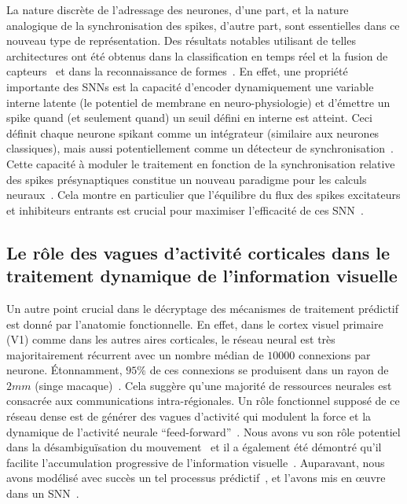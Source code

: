 La nature discrète de l'adressage des neurones, d'une part, et la nature
analogique de la synchronisation des spikes, d'autre part, sont
essentielles dans ce nouveau type de représentation. Des résultats
notables utilisant de telles architectures ont été obtenus dans la
classification en temps réel et la fusion de capteurs~\citep{Oconnor13} et dans la reconnaissance de formes~\citep{Lagorce17}. En
effet, une propriété importante des SNNs est la capacité d'encoder
dynamiquement une variable interne latente (le potentiel de membrane en
neuro-physiologie) et d'émettre un spike quand (et seulement quand) un
seuil défini en interne est atteint. Ceci définit chaque neurone spikant
comme un intégrateur (similaire aux neurones classiques), mais aussi
potentiellement comme un détecteur de synchronisation~\citep{Perrinet02}.
Cette capacité à moduler le traitement en fonction de la synchronisation
relative des spikes présynaptiques constitue un nouveau paradigme pour les
calculs neuraux~\citep{Paugam12}. Cela montre en
particulier que l'équilibre du flux des spikes excitateurs et inhibiteurs
entrants est crucial pour maximiser l'efficacité de ces SNN~\citep{Hansel12}.

\subsection{Le rôle des vagues d'activité corticales dans le traitement
dynamique de l'information
visuelle}
Un autre point crucial dans le décryptage des mécanismes de traitement
prédictif est donné par l'anatomie fonctionnelle. En effet, dans le
cortex visuel primaire (V1) comme dans les autres aires corticales, le
réseau neural est très majoritairement récurrent avec un nombre médian de $10000$
connexions par neurone. Étonnamment, $95 \%$ de ces connexions se
produisent dans un rayon de $2 mm$ (singe macaque)~\citep{Markov13}.
Cela suggère qu'une majorité de ressources neurales est consacrée aux
communications intra-régionales. Un rôle fonctionnel supposé de ce
réseau dense est de générer des vagues d'activité qui modulent la force
et la dynamique de l'activité neurale ``feed-forward''~\citep{Muller18}. Nous avons vu son rôle potentiel dans la désambiguïsation du
mouvement~\citep{Chemla19} et il a également été démontré qu'il
facilite l'accumulation progressive de l'information visuelle~\citep{Bringuier99}. Auparavant, nous avons modélisé avec succès un tel
processus prédictif~\citep{Perrinet12pred,Khoei13jpp,KhoeiMassonPerrinet17}, et l'avons mis en œuvre dans un SNN~\citep{Kaplan13}.

